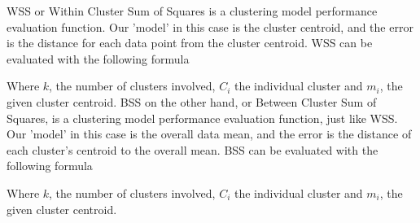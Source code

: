 \documentclass[11pt]{article}
\begin{document}
				\fi
				WSS or  Within Cluster Sum of Squares is a clustering model performance evaluation function. Our 'model' in this case is the cluster centroid, and the error is the distance for each data point from the cluster centroid. WSS can be evaluated with the following formula\cite{sse}

				Where $k$, the number of clusters involved, $C_i$ the individual cluster and $m_i$, the given cluster centroid.
				BSS on the other hand, or  Between Cluster Sum of Squares, is a clustering model performance evaluation function, just like WSS. Our 'model' in this case is the overall data mean, and the error is the distance of each cluster's centroid to the overall mean. BSS can be evaluated with the following formula\cite{sse}

				Where $k$, the number of clusters involved, $C_i$ the individual cluster and $m_i$, the given cluster centroid.
\end{document}
